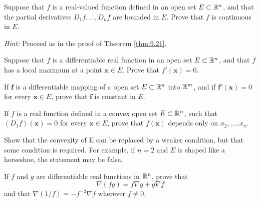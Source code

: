 \begin{myExercise}
    \label{ex:9.7}
    Suppose that $f$ is a real-valued function defined in an open set $E \subset {\protect\mathbb R}^n$, 
    and that the partial derivatives $D_1f, \dots , D_nf$ are bounded in $E$. 
    Prove that $f$ is continuous in $E$.

    \emph{Hint:} Proceed as in the proof of Theorem \ref{thm:9.21}.
\end{myExercise}


\begin{myExercise}
    \label{ex:9.8}
    Suppose that $f$ is a differentiable real function in an open set $E \subset {\protect\mathbb R}^n$, 
    and that $f$ has a local maximum at a point $\mathbf{x} \in E$. 
    Prove that $f'(\mathbf{x}) = 0$.
\end{myExercise}


\begin{myExercise}
    \label{ex:9.9}
    If $\mathbf{f}$ is a differentiable mapping of a  open set $E \subset {\protect\mathbb R}^n$ into ${\protect\mathbb R}^m$, 
    and if $\mathbf{f}'(\mathbf{x}) = 0$ for every $\mathbf{x} \in E$, 
    prove that $\mathbf{f}$ is constant in $E$.
\end{myExercise}


\begin{myExercise}
    \label{ex:9.10}
    If $f$ is a real function defined in a convex open set $E \subset {\protect\mathbb R}^n$, 
    such that $(D_1f)(\mathbf{x}) = 0$ for every $\mathbf{x} \in E$, 
    prove that $f(\mathbf{x})$ depends only on $x_2, ... , x_n$.

    Show that the convexity of E can be replaced by a weaker condition, but that some condition is required. 
    For example, if $n = 2$ and $E$ is shaped like a horseshoe, the statement may be false.
\end{myExercise}



\begin{myExercise}
    \label{ex:9.11}
    If $f$ and $g$ are differentiable real functions in ${\protect\mathbb R}^n$, 
    prove that
    \begin{equation*}
        \nabla (fg) = 
        f\nabla g + 
        g\nabla f 
    \end{equation*}
    and that $\nabla (1/f)=-f^{-2}\nabla f$ wherever $f \neq 0$.
\end{myExercise}



